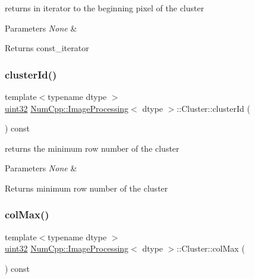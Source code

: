 returns in iterator to the beginning pixel of the cluster


\begin{DoxyParams}{Parameters}
{\em None} & \\
\hline
\end{DoxyParams}
\begin{DoxyReturn}{Returns}
const\+\_\+iterator 
\end{DoxyReturn}
\mbox{\label{class_num_cpp_1_1_image_processing_1_1_cluster_a947f832c565ce3a89d53579cb2817cda}} 
\subsubsection{\texorpdfstring{cluster\+Id()}{clusterId()}}
{\footnotesize\ttfamily template$<$typename dtype $>$ \\
\mbox{\hyperlink{namespace_num_cpp_a36f388e948380413c63011cab9b7fbd5}{uint32}} \mbox{\hyperlink{class_num_cpp_1_1_image_processing}{Num\+Cpp\+::\+Image\+Processing}}$<$ dtype $>$\+::Cluster\+::cluster\+Id (\begin{DoxyParamCaption}{ }\end{DoxyParamCaption}) const\hspace{0.3cm}{\ttfamily [inline]}}

returns the minimum row number of the cluster


\begin{DoxyParams}{Parameters}
{\em None} & \\
\hline
\end{DoxyParams}
\begin{DoxyReturn}{Returns}
minimum row number of the cluster 
\end{DoxyReturn}
\mbox{\label{class_num_cpp_1_1_image_processing_1_1_cluster_a6bb57ad3da4b9ee976fe452294acad72}} 
\subsubsection{\texorpdfstring{col\+Max()}{colMax()}}
{\footnotesize\ttfamily template$<$typename dtype $>$ \\
\mbox{\hyperlink{namespace_num_cpp_a36f388e948380413c63011cab9b7fbd5}{uint32}} \mbox{\hyperlink{class_num_cpp_1_1_image_processing}{Num\+Cpp\+::\+Image\+Processing}}$<$ dtype $>$\+::Cluster\+::col\+Max (\begin{DoxyParamCaption}{ }\end{DoxyParamCaption}) const\hspace{0.3cm}{\ttfamily [inline]}}


